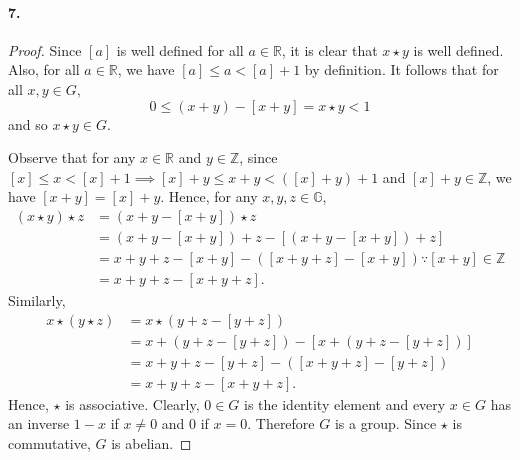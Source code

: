 \documentclass{article}
\begin{document}
\paragraph{7.}
\begin{proof}
  Since $[a]$ is well defined for all $a \in \mathbb{R}$, it is clear that $x
  \star y$ is well defined. Also, for all $a \in \mathbb{R}$, we have $[a] \leq
  a < [a] + 1$ by definition. It follows that for all $x, y \in G$, \[
    0 \leq (x + y) - [x + y] = x \star y < 1
  \] and so $x \star y \in G$.

  Observe that for any $x \in \mathbb{R}$ and $y \in \mathbb{Z}$, since $[x]
  \leq x < [x] + 1 \implies [x] + y \leq x + y < ([x] + y) + 1$ and $[x] + y \in
  \mathbb{Z}$, we have $[x + y] = [x] + y$. Hence, for any $x, y, z \in
  \mathbb{G}$, \begin{align*}
    (x \star y) \star z
    &= (x + y - [x + y]) \star z \\
    &= (x + y - [x + y]) + z - [(x + y - [x + y]) + z] \\
    &= x + y + z - [x + y] - ([x + y + z] - [x + y]) \because [x + y] \in
    \mathbb{Z} \\
    &= x + y + z - [x + y + z].
  \end{align*} Similarly, \begin{align*}
    x \star (y \star z)
    &= x \star (y + z - [y + z]) \\
    &= x + (y + z - [y + z]) - [x + (y + z - [y + z])] \\
    &= x + y + z - [y + z] - ([x + y + z] - [y + z]) \\
    &= x + y + z - [x + y + z].
  \end{align*}
  Hence, $\star$ is associative. Clearly, $0 \in G$ is the identity element and 
  every $x \in G$ has an inverse $1 - x$ if $x \neq 0$ and $0$ if $x = 0$.
  Therefore $G$ is a group. Since $\star$ is commutative, $G$ is abelian.
\end{proof}
\end{document}
